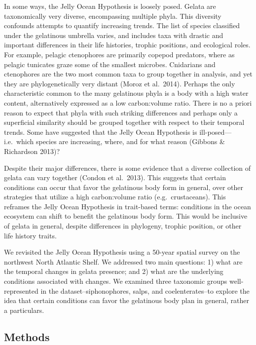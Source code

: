 \documentclass[
]{article}
\begin{document}
In some ways, the Jelly Ocean Hypothesis is loosely posed. Gelata are
taxonomically very diverse, encompassing multiple phyla. This diversity
confounds attempts to quantify increasing trends. The list of species
classified under the gelatinous umbrella varies, and includes taxa with
drastic and important differences in their life histories, trophic
positions, and ecological roles. For example, pelagic ctenophores are
primarily copepod predators, where as pelagic tunicates graze some of
the smallest microbes. Cnidarians and ctenophores are the two most
common taxa to group together in analysis, and yet they are
phylogenetically very distant (Moroz et al.~2014). Perhaps the only
characteristic common to the many gelatinous phyla is a body with a high
water content, alternatively expressed as a low carbon:volume ratio.
There is no a priori reason to expect that phyla with such striking
differences and perhaps only a superficial similarity should be grouped
together with respect to their temporal trends. Some have suggested that
the Jelly Ocean Hypothesis is ill-posed---i.e.~which species are
increasing, where, and for what reason (Gibbons \& Richardson 2013)?

Despite their major differences, there is some evidence that a diverse
collection of gelata can vary together (Condon et al.~2013). This
suggests that certain conditions can occur that favor the gelatinous
body form in general, over other strategies that utilize a high
carbon:volume ratio (e.g.~crustaceans). This reframes the Jelly Ocean
Hypothesis in trait-based terms: conditions in the ocean ecosystem can
shift to benefit the gelatinous body form. This would be inclusive of
gelata in general, despite differences in phylogeny, trophic position,
or other life history traits.

We revisited the Jelly Ocean Hypothesis using a 50-year spatial survey
on the northwest North Atlantic Shelf. We addressed two main questions:
1) what are the temporal changes in gelata presence; and 2) what are the
underlying conditions associated with changes. We examined three
taxonomic groups well-represented in the dataset--siphonophores, salps,
and coelenterates--to explore the idea that certain conditions can favor
the gelatinous body plan in general, rather a particulars.

\subsection{Methods}\label{methods}
\end{document}
